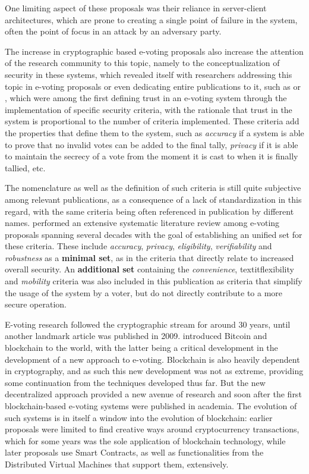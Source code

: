 \documentclass[../access.tex]{subfiles}
\begin{document}
One limiting aspect of these proposals was their reliance in server-client architectures, which are prone to creating a single point of failure in the system, often the point of focus in an attack by an adversary party.
\par
The increase in cryptographic based e-voting proposals also increase the attention of the research community to this topic, namely to the conceptualization of security in these systems, which revealed itself with researchers addressing this topic in e-voting proposals or even dedicating entire publications to it, such as \cite{Neumann1993} or \cite{Fujioka1992}, which were among the first defining trust in an e-voting system through the implementation of specific security criteria, with the rationale that trust in the system is proportional to the number of criteria implemented. These criteria add the properties that define them to the system, such as \textit{accuracy} if a system is able to prove that no invalid votes can be added to the final tally, \textit{privacy} if it is able to maintain the secrecy of a vote from the moment it is cast to when it is finally tallied, etc.
\par
The nomenclature as well as the definition of such criteria is still quite subjective among relevant publications, as a consequence of a lack of standardization in this regard, with the same criteria being often referenced in publication by different names. \cite{Almeida2023} performed an extensive systematic literature review among e-voting proposals spanning several decades with the goal of establishing an unified set for these criteria. These include \textit{accuracy}, \textit{privacy}, \textit{eligibility}, \textit{verifiability} and \textit{robustness} as a \textbf{minimal set}, as in the criteria that directly relate to increased overall security. An \textbf{additional set} containing the \textit{convenience}, textit{flexibility} and \textit{mobility} criteria was also included in this publication as criteria that simplify the usage of the system by a voter, but do not directly contribute to a more secure operation.
\par
E-voting research followed the cryptographic stream for around 30 years, until another landmark article was published in 2009. \cite{Nakamoto2008} introduced Bitcoin and blockchain to the world, with the latter being a critical development in the development of a new approach to e-voting. Blockchain is also heavily dependent in cryptography, and as such this new development was not as extreme, providing some continuation from the techniques developed thus far. But the new decentralized approach provided a new avenue of research and soon after the first blockchain-based e-voting systems were published in academia. The evolution of such systems is in itself a window into the evolution of blockchain: earlier proposals were limited to find creative ways around cryptocurrency transactions, which for some years was the sole application of blockchain technology, while later proposals use Smart Contracts, as well as functionalities from the Distributed Virtual Machines that support them, extensively.
\end{document}

